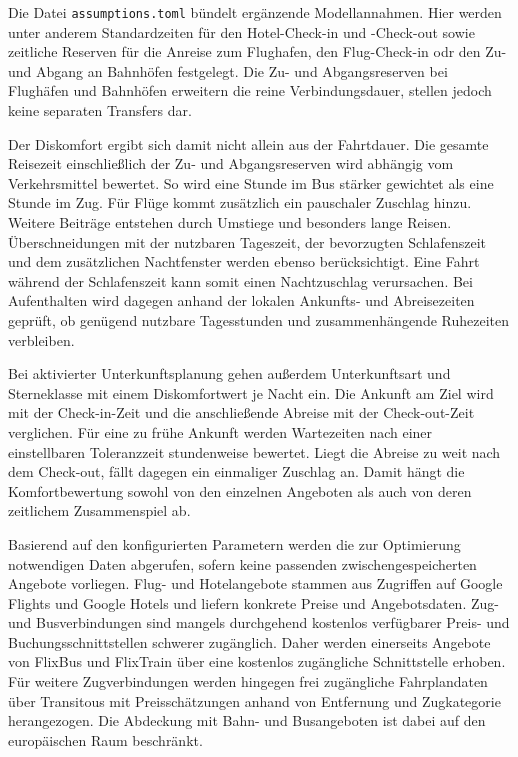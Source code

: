 Die Datei \texttt{assumptions.toml} bündelt ergänzende Modellannahmen. Hier werden unter anderem Standardzeiten für den Hotel-Check-in und -Check-out sowie zeitliche Reserven für die Anreise zum Flughafen, den Flug-Check-in odr den Zu- und Abgang an Bahnhöfen festgelegt. Die Zu- und Abgangsreserven bei Flughäfen und Bahnhöfen erweitern die reine Verbindungsdauer, stellen jedoch keine separaten Transfers dar.

Der Diskomfort ergibt sich damit nicht allein aus der Fahrtdauer. Die gesamte Reisezeit einschließlich der Zu- und Abgangsreserven wird abhängig vom Verkehrsmittel bewertet. So wird eine Stunde im Bus stärker gewichtet als eine Stunde im Zug. Für Flüge kommt zusätzlich ein pauschaler Zuschlag hinzu. Weitere Beiträge entstehen durch Umstiege und besonders lange Reisen. Überschneidungen mit der nutzbaren Tageszeit, der bevorzugten Schlafenszeit und dem zusätzlichen Nachtfenster werden ebenso berücksichtigt. Eine Fahrt während der Schlafenszeit kann somit einen Nachtzuschlag verursachen. Bei Aufenthalten wird dagegen anhand der lokalen Ankunfts- und Abreisezeiten geprüft, ob genügend nutzbare Tagesstunden und zusammenhängende Ruhezeiten verbleiben.

Bei aktivierter Unterkunftsplanung gehen außerdem Unterkunftsart und Sterneklasse mit einem Diskomfortwert je Nacht ein. Die Ankunft am Ziel wird mit der Check-in-Zeit und die anschließende Abreise mit der Check-out-Zeit verglichen. Für eine zu frühe Ankunft werden Wartezeiten nach einer einstellbaren Toleranzzeit stundenweise bewertet. Liegt die Abreise zu weit nach dem Check-out, fällt dagegen ein einmaliger Zuschlag an. Damit hängt die Komfortbewertung sowohl von den einzelnen Angeboten als auch von deren zeitlichem Zusammenspiel ab.

Basierend auf den konfigurierten Parametern werden die zur Optimierung notwendigen Daten abgerufen, sofern keine passenden zwischengespeicherten Angebote vorliegen. Flug- und Hotelangebote stammen aus Zugriffen auf Google Flights und Google Hotels und liefern konkrete Preise und Angebotsdaten. Zug- und Busverbindungen sind mangels durchgehend kostenlos verfügbarer Preis- und Buchungsschnittstellen schwerer zugänglich. Daher werden einerseits Angebote von FlixBus und FlixTrain über eine kostenlos zugängliche Schnittstelle erhoben. Für weitere Zugverbindungen werden hingegen frei zugängliche Fahrplandaten über Transitous mit Preisschätzungen anhand von Entfernung und Zugkategorie herangezogen. Die Abdeckung mit Bahn- und Busangeboten ist dabei auf den europäischen Raum beschränkt.

